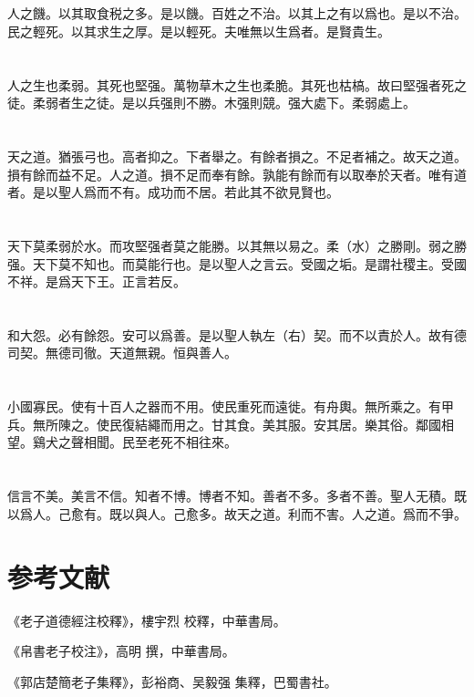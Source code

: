 \documentclass[a5paper]{ctexbook}
\begin{document}
    \chapter{}

    人之饑。以其取食税之多。是以饑。百姓之不治。以其上之有以爲也。是以不治。民之輕死。以其求生之厚。是以輕死。夫唯無以生爲者。是賢貴生。

    \chapter{}

    人之生也柔弱。其死也堅强。萬物草木之生也柔脆。其死也枯槁。故曰堅强者死之徒。柔弱者生之徒。是以兵强則不勝。木强則競。强大處下。柔弱處上。

    \chapter{}

    天之道。猶張弓也。高者抑之。下者舉之。有餘者損之。不足者補之。故天之道。損有餘而益不足。人之道。損不足而奉有餘。孰能有餘而有以取奉於天者。唯有道者。是以聖人爲而不有。成功而不居。若此其不欲見賢也。

    \chapter{}

    天下莫柔弱於水。而攻堅强者莫之能勝。以其無以易之。柔（水）之勝剛。弱之勝强。天下莫不知也。而莫能行也。是以聖人之言云。受國之垢。是謂社稷主。受國不祥。是爲天下王。正言若反。

    \chapter{}

    和大怨。必有餘怨。安可以爲善。是以聖人執左（右）契。而不以責於人。故有德司契。無德司徹。天道無親。恒與善人。

    \chapter{}

    小國寡民。使有十百人之器而不用。使民重死而遠徙。有舟輿。無所乘之。有甲兵。無所陳之。使民復結繩而用之。甘其食。美其服。安其居。樂其俗。鄰國相望。鷄犬之聲相聞。民至老死不相往來。

    \chapter{}

    信言不美。美言不信。知者不博。博者不知。善者不多。多者不善。聖人无積。既以爲人。己愈有。既以與人。己愈多。故天之道。利而不害。人之道。爲而不爭。

    \chapter*{参考文献}

    《老子道德經注校釋》，樓宇烈 校釋，中華書局。

    《帛書老子校注》，高明 撰，中華書局。

    《郭店楚簡老子集釋》，彭裕商、吴毅强 集釋，巴蜀書社。
\end{document}
